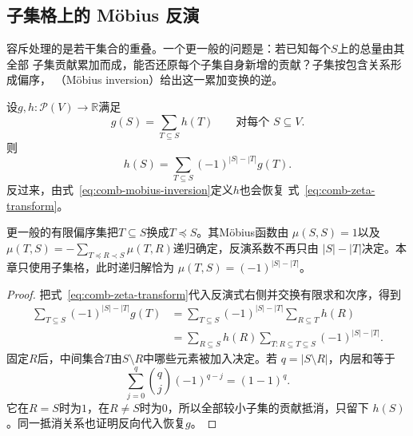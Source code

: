 \subsection{子集格上的 Möbius 反演}

容斥处理的是若干集合的重叠。一个更一般的问题是：若已知每个$S$上的总量由其全部
子集贡献累加而成，能否还原每个子集自身新增的贡献？子集按包含关系形成偏序，
（Möbius inversion）给出这一累加变换的逆。

\begin{theorem}
\label{thm:comb-mobius-inversion}
设$g,h:\mathcal{P}(V)\to\mathbb{R}$满足
\begin{equation}
  g(S)=\sum_{T\subseteq S}h(T)
  \qquad\text{对每个 }S\subseteq V.
  \label{eq:comb-zeta-transform}
\end{equation}
则
\begin{equation}
  h(S)
  =
  \sum_{T\subseteq S}(-1)^{|S|-|T|}g(T).
  \label{eq:comb-mobius-inversion}
\end{equation}
反过来，由式~\eqref{eq:comb-mobius-inversion}定义$h$也会恢复
式~\eqref{eq:comb-zeta-transform}。
\end{theorem}

更一般的有限偏序集把$T\subseteq S$换成$T\preceq S$。其Möbius函数由
$\mu(S,S)=1$以及
$\mu(T,S)=-\sum_{T\preceq R\prec S}\mu(T,R)$递归确定，反演系数不再只由
$|S|-|T|$决定。本章只使用子集格，此时递归解恰为
$\mu(T,S)=(-1)^{|S|-|T|}$。

\begin{proof}
把式~\eqref{eq:comb-zeta-transform}代入反演式右侧并交换有限求和次序，得到
\begin{align*}
  \sum_{T\subseteq S}(-1)^{|S|-|T|}g(T)
  &=
  \sum_{T\subseteq S}(-1)^{|S|-|T|}
  \sum_{R\subseteq T}h(R)\\
  &=
  \sum_{R\subseteq S}h(R)
  \sum_{T:R\subseteq T\subseteq S}
  (-1)^{|S|-|T|}.
\end{align*}
固定$R$后，中间集合$T$由$S\setminus R$中哪些元素被加入决定。若
$q=|S\setminus R|$，内层和等于
\[
  \sum_{j=0}^{q}\binom{q}{j}(-1)^{q-j}
  =(1-1)^q.
\]
它在$R=S$时为$1$，在$R\neq S$时为$0$，所以全部较小子集的贡献抵消，只留下
$h(S)$。同一抵消关系也证明反向代入恢复$g$。
\end{proof}

